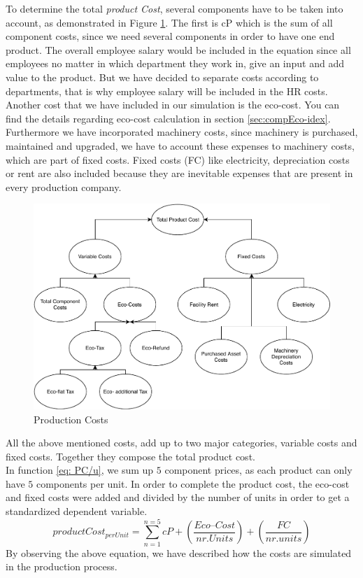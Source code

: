 To determine the total \textit{product Cost}, several components have to be taken into account, as demonstrated in Figure \ref{fig:productionCosts}. The first is cP which is the sum of all component costs, since we need several components in order to have one end product. The overall employee salary would be included in the equation since all employees no matter in which department they work in, give an input and add value to the product. But we have decided to separate costs according to departments, that is why employee salary will be included in the HR costs. Another cost that we have included in our simulation is the eco-cost. You can find the details regarding eco-cost calculation in section \ref{sec:compEco-idex}. Furthermore we have incorporated machinery costs, since machinery is purchased, maintained and upgraded, we have to account these expenses to machinery costs, which are part of fixed costs. Fixed costs (FC) like electricity, depreciation costs or rent are also included because they are inevitable expenses that are present in every production company. 

\begin{figure}[ht]
	\centering
		\includegraphics[scale=0.55]{images/ProductCost.pdf}
	\caption{Production Costs}
	\label{fig:productionCosts}
\end{figure}
All the above mentioned costs, add up to two major categories, variable costs and fixed costs. Together they compose the total product cost.\\
 In function \ref{eq: PC/u}, we sum up $5$ component prices, as each product can only have $5$ components per unit. In order to complete the product cost, the eco-cost and fixed costs were added and divided by the number of units in order to get a standardized dependent variable.
\begin{equation}
	product Cost_{per Unit}= \sum_{n=1}^{n=5}cP + (\frac{Eco–Cost}{nr. Units}) + (\frac{FC}{nr. units}) 
	\label{eq: PC/u}
\end{equation}
By observing the above equation, we have described how the costs are simulated in the production process. 

